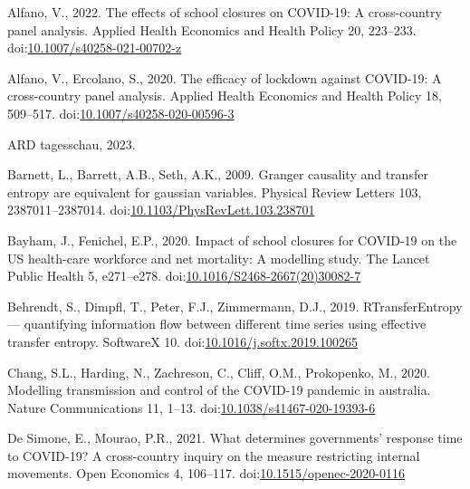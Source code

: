 \documentclass[unnumsec,webpdf,contemporary,large]{oup-authoring-template}%
\theoremstyle{thmstyleone}%
\theoremstyle{thmstyletwo}%
\theoremstyle{thmstylethree}%
\newlength{\cslhangindent}
\newlength{\cslentryspacingunit} %
\newenvironment{CSLReferences}[2] %
 {%
  \setlength{\parindent}{0pt}
  \ifodd #1
  \let\oldpar\par
  \def\par{\hangindent=\cslhangindent\oldpar}
  \fi
  \setlength{\parskip}{#2\cslentryspacingunit}
 }%
 {}
\begin{document}
\hypertarget{refs}{}
\begin{CSLReferences}{1}{0}
\leavevmode{}%
Alfano, V., 2022. The effects of school closures on COVID-19: A cross-country panel analysis. Applied Health Economics and Health Policy 20, 223--233. doi:\href{https://doi.org/10.1007/s40258-021-00702-z}{10.1007/s40258-021-00702-z}

\leavevmode{}%
Alfano, V., Ercolano, S., 2020. The efficacy of lockdown against COVID-19: A cross-country panel analysis. Applied Health Economics and Health Policy 18, 509--517. doi:\href{https://doi.org/10.1007/s40258-020-00596-3}{10.1007/s40258-020-00596-3}

\leavevmode{}%
ARD tagesschau, 2023.

\leavevmode{}%
Barnett, L., Barrett, A.B., Seth, A.K., 2009. Granger causality and transfer entropy are equivalent for gaussian variables. Physical Review Letters 103, 2387011--2387014. doi:\href{https://doi.org/10.1103/PhysRevLett.103.238701}{10.1103/PhysRevLett.103.238701}

\leavevmode{}%
Bayham, J., Fenichel, E.P., 2020. Impact of school closures for COVID-19 on the US health-care workforce and net mortality: A modelling study. The Lancet Public Health 5, e271--e278. doi:\href{https://doi.org/10.1016/S2468-2667(20)30082-7}{10.1016/S2468-2667(20)30082-7}

\leavevmode{}%
Behrendt, S., Dimpfl, T., Peter, F.J., Zimmermann, D.J., 2019. RTransferEntropy --- quantifying information flow between different time series using effective transfer entropy. SoftwareX 10. doi:\href{https://doi.org/10.1016/j.softx.2019.100265}{10.1016/j.softx.2019.100265}

\leavevmode{}%
Chang, S.L., Harding, N., Zachreson, C., Cliff, O.M., Prokopenko, M., 2020. Modelling transmission and control of the COVID-19 pandemic in australia. Nature Communications 11, 1--13. doi:\href{https://doi.org/10.1038/s41467-020-19393-6}{10.1038/s41467-020-19393-6}

\leavevmode{}%
De Simone, E., Mourao, P.R., 2021. What determines governments' response time to COVID-19? A cross-country inquiry on the measure restricting internal movements. Open Economics 4, 106--117. doi:\href{https://doi.org/10.1515/openec-2020-0116}{10.1515/openec-2020-0116}


\end{CSLReferences}
\end{document}

